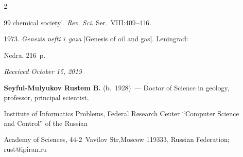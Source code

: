 \begin{multicols}{2}
{{\begin{thebibliography}{99}
chemical society]. \textit{Rev. Sci.} Ser.~VIII:409--416.


 1973. \textit{Genezis nefti i~gaza} [Genesis of oil and gas]. Leningrad: 

Nedra. 216~p.

\end{thebibliography}



 }

 }



\end{multicols}



\vspace*{-6pt}



\hfill{\small\textit{Received October 15, 2019}}









\Contrl



\noindent

\textbf{Seyful-Mulyukov Rustem B.} (b.\ 1928)~--- Doctor of Science in geology, professor, principal scientist, 

Institute of Informatics Problems, Federal Research Center ``Computer Science and Control'' of the Russian 

Academy of Sciences, 44-2~Vavilov Str,Moscow 119333, Russian Federation; \mbox{rust@ipiran.ru}

\label{end\stat}



\renewcommand{\bibname}{\protect\rm Литература}  

    

